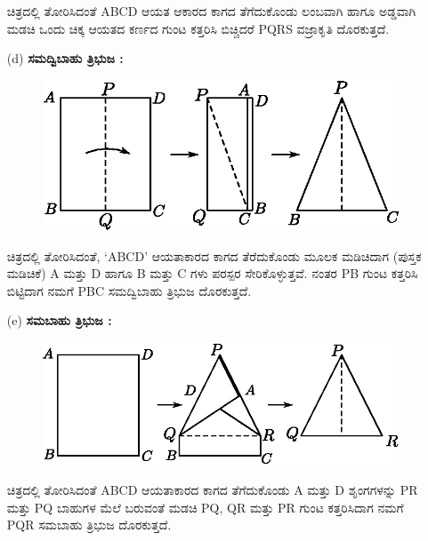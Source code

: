 \begin{itemize}
ಚಿತ್ರದಲ್ಲಿ ತೋರಿಸಿದಂತೆ  ABCD ಆಯತ ಆಕಾರದ ಕಾಗದ ತೆಗೆದುಕೊಂಡು ಲಂಬವಾಗಿ ಹಾಗೂ ಅಡ್ಡವಾಗಿ ಮಡಚಿ ಒಂದು ಚಿಕ್ಕ ಆಯತದ ಕರ್ಣದ ಗುಂಟ ಕತ್ತರಿಸಿ ಬಿಚ್ಚಿದರೆ PQRS ವಜ್ರಾಕೃತಿ ದೊರಕುತ್ತದೆ. 

\item[(d)] \textbf{ಸಮದ್ವಿಬಾಹು ತ್ರಿಭುಜ :}
\begin{figure}[H]
\centering
\includegraphics[scale=.98]{src/figure/chap1/fig1-15d.eps}
\end{figure}

ಚಿತ್ರದಲ್ಲಿ ತೋರಿಸಿದಂತೆ, `ABCD' ಆಯತಾಕಾರದ ಕಾಗದ ತೆರೆದುಕೊಂಡು ಮೂಲಕ ಮಡಿಚಿದಾಗ (ಪುಸ್ತಕ ಮಡಿಚಿಕೆ) A ಮತ್ತು D ಹಾಗೂ  B ಮತ್ತು  C ಗಳು ಪರಸ್ಪರ ಸೇರಿಕೊಳ್ಳುತ್ತವೆ. ನಂತರ PB ಗುಂಟ ಕತ್ತರಿಸಿ ಬಿಟ್ಟಿದಾಗ ನಮಗೆ  PBC ಸಮದ್ವಿಬಾಹು ತ್ರಿಭುಜ ದೊರಕುತ್ತದೆ. 


\item[(e)] \textbf{ಸಮಬಾಹು ತ್ರಿಭುಜ : }
\begin{figure}[H]
\centering
\includegraphics[scale=.98]{src/figure/chap1/fig1-15e.eps}
\end{figure}

ಚಿತ್ರದಲ್ಲಿ ತೋರಿಸಿದಂತೆ ABCD ಆಯತಾಕಾರದ ಕಾಗದ ತೆಗೆದುಕೊಂಡು A ಮತ್ತು  D ಶೃಂಗಗಳನ್ನು PR ಮತ್ತು PQ  ಬಾಹುಗಳ ಮೆಲೆ ಬರುವಂತೆ ಮಡಚಿ  PQ, QR ಮತ್ತು PR ಗುಂಟ ಕತ್ತರಿಸಿದಾಗ ನಮಗೆ PQR ಸಮಬಾಹು ತ್ರಿಭುಜ ದೊರಕುತ್ತದೆ. 
\end{itemize}

